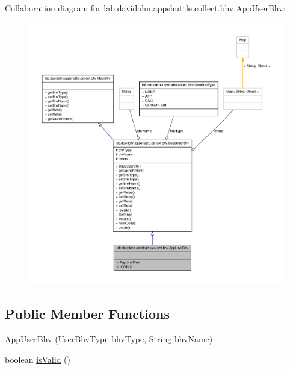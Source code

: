 \-Collaboration diagram for lab.\-davidahn.\-appshuttle.\-collect.\-bhv.\-App\-User\-Bhv\-:
\nopagebreak
\begin{figure}[H]
\begin{center}
\leavevmode
\includegraphics[width=350pt]{classlab_1_1davidahn_1_1appshuttle_1_1collect_1_1bhv_1_1_app_user_bhv__coll__graph}
\end{center}
\end{figure}
\subsection*{\-Public \-Member \-Functions}
\begin{DoxyCompactItemize}
\item 
\hyperlink{classlab_1_1davidahn_1_1appshuttle_1_1collect_1_1bhv_1_1_app_user_bhv_aaadf1c0a82f5d24b313faeb0e75f21ac}{\-App\-User\-Bhv} (\hyperlink{enumlab_1_1davidahn_1_1appshuttle_1_1collect_1_1bhv_1_1_user_bhv_type}{\-User\-Bhv\-Type} \hyperlink{classlab_1_1davidahn_1_1appshuttle_1_1collect_1_1bhv_1_1_base_user_bhv_a29dae66ba4bf89a75849d77a35a57cb2}{bhv\-Type}, \-String \hyperlink{classlab_1_1davidahn_1_1appshuttle_1_1collect_1_1bhv_1_1_base_user_bhv_aa211c66df8abf7df665859d662891cc0}{bhv\-Name})
\item 
boolean \hyperlink{classlab_1_1davidahn_1_1appshuttle_1_1collect_1_1bhv_1_1_app_user_bhv_af39ec32e67b24b1cee291e6d93c25938}{is\-Valid} ()
\end{DoxyCompactItemize}


